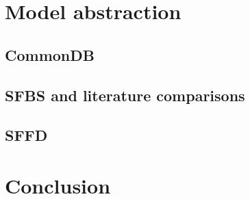 \documentclass[%
    corpo=12pt,
    twoside,
    oldstyle,
    autoretitolo,
    greek,
    evenboxes,
]{toptesi}
\begin{document}

\chapter{Model abstraction}
\section{CommonDB}
\section{SFBS and literature comparisons}
\section{SFFD}



\chapter{Conclusion}





\end{document}
